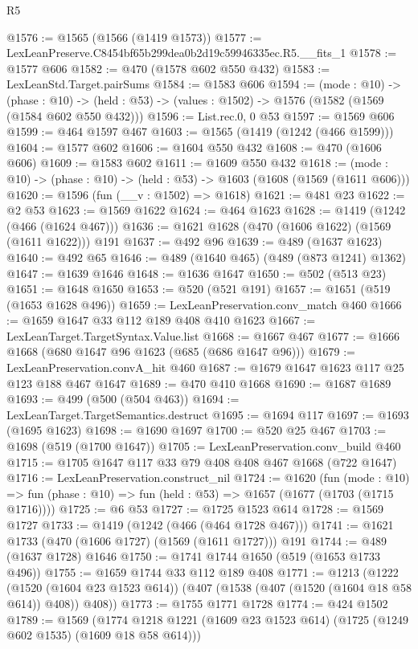 \begin{lexlean}{R5}
\begin{coremodule}
@1576 := @1565 (@1566 (@1419 @1573))
@1577 := LexLeanPreserve.C8454bf65b299dea0b2d19c59946335ec.R5.__fits_1
@1578 := @1577 @606
@1582 := @470 (@1578 @602 @550 @432)
@1583 := LexLeanStd.Target.pairSums
@1584 := @1583 @606
@1594 := (mode : @10) ->
  (phase : @10) -> (held : @53) -> (values : @1502) -> @1576 (@1582 (@1569 (@1584 @602 @550 @432)))
@1596 := List.rec.{0, 0} @53
@1597 := @1569 @606
@1599 := @464 @1597 @467
@1603 := @1565 (@1419 (@1242 (@466 @1599)))
@1604 := @1577 @602
@1606 := @1604 @550 @432
@1608 := @470 (@1606 @606)
@1609 := @1583 @602
@1611 := @1609 @550 @432
@1618 := (mode : @10) -> (phase : @10) -> (held : @53) -> @1603 (@1608 (@1569 (@1611 @606)))
@1620 := @1596 (fun (__v : @1502) => @1618)
@1621 := @481 @23
@1622 := @2 @53
@1623 := @1569 @1622
@1624 := @464 @1623
@1628 := @1419 (@1242 (@466 (@1624 @467)))
@1636 := @1621 @1628 (@470 (@1606 @1622) (@1569 (@1611 @1622))) @191
@1637 := @492 @96
@1639 := @489 (@1637 @1623)
@1640 := @492 @65
@1646 := @489 (@1640 @465) (@489 (@873 @1241) @1362)
@1647 := @1639 @1646
@1648 := @1636 @1647
@1650 := @502 (@513 @23)
@1651 := @1648 @1650
@1653 := @520 (@521 @191)
@1657 := @1651 (@519 (@1653 @1628 @496))
@1659 := LexLeanPreservation.conv_match @460
@1666 := @1659 @1647 @33 @112 @189 @408 @410 @1623
@1667 := LexLeanTarget.TargetSyntax.Value.list
@1668 := @1667 @467
@1677 := @1666 @1668 (@680 @1647 @96 @1623 (@685 (@686 @1647 @96)))
@1679 := LexLeanPreservation.convA_hit @460
@1687 := @1679 @1647 @1623 @117 @25 @123 @188 @467 @1647
@1689 := @470 @410 @1668
@1690 := @1687 @1689
@1693 := @499 (@500 (@504 @463))
@1694 := LexLeanTarget.TargetSemantics.destruct
@1695 := @1694 @117
@1697 := @1693 (@1695 @1623)
@1698 := @1690 @1697
@1700 := @520 @25 @467
@1703 := @1698 (@519 (@1700 @1647))
@1705 := LexLeanPreservation.conv_build @460
@1715 := @1705 @1647 @117 @33 @79 @408 @408 @467 @1668 (@722 @1647)
@1716 := LexLeanPreservation.construct_nil
@1724 := @1620
    (fun (mode : @10) =>
    fun (phase : @10) => fun (held : @53) => @1657 (@1677 (@1703 (@1715 @1716))))
@1725 := @6 @53
@1727 := @1725 @1523 @614
@1728 := @1569 @1727
@1733 := @1419 (@1242 (@466 (@464 @1728 @467)))
@1741 := @1621 @1733 (@470 (@1606 @1727) (@1569 (@1611 @1727))) @191
@1744 := @489 (@1637 @1728) @1646
@1750 := @1741 @1744 @1650 (@519 (@1653 @1733 @496))
@1755 := @1659 @1744 @33 @112 @189 @408
@1771 := @1213
    (@1222
      (@1520 (@1604 @23 @1523 @614))
      (@407 (@1538 (@407 (@1520 (@1604 @18 @58 @614)) @408)) @408))
@1773 := @1755 @1771 @1728
@1774 := @424 @1502
@1789 := @1569
    (@1774 @1218 @1221 (@1609 @23 @1523 @614) (@1725 (@1249 @602 @1535) (@1609 @18 @58 @614)))

\end{coremodule}
\end{lexlean}
